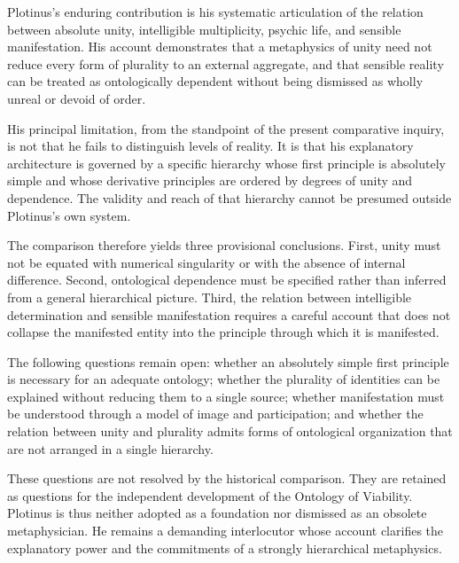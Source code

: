 \label{para:VS.B01.P01.C08.S06.SS10.P001}
Plotinus's enduring contribution is his systematic articulation
of the relation between absolute unity, intelligible multiplicity,
psychic life, and sensible manifestation. His account demonstrates
that a metaphysics of unity need not reduce every form of plurality
to an external aggregate, and that sensible reality can be treated
as ontologically dependent without being dismissed as wholly
unreal or devoid of order.

\label{para:VS.B01.P01.C08.S06.SS10.P002}
His principal limitation, from the standpoint of the present
comparative inquiry, is not that he fails to distinguish levels
of reality. It is that his explanatory architecture is governed
by a specific hierarchy whose first principle is absolutely
simple and whose derivative principles are ordered by degrees
of unity and dependence. The validity and reach of that hierarchy
cannot be presumed outside Plotinus's own system.

\label{para:VS.B01.P01.C08.S06.SS10.P003}
The comparison therefore yields three provisional conclusions.
First, unity must not be equated with numerical singularity or
with the absence of internal difference. Second, ontological
dependence must be specified rather than inferred from a general
hierarchical picture. Third, the relation between intelligible
determination and sensible manifestation requires a careful
account that does not collapse the manifested entity into the
principle through which it is manifested.

\label{para:VS.B01.P01.C08.S06.SS10.P004}
The following questions remain open: whether an absolutely simple
first principle is necessary for an adequate ontology; whether
the plurality of identities can be explained without reducing
them to a single source; whether manifestation must be understood
through a model of image and participation; and whether the
relation between unity and plurality admits forms of ontological
organization that are not arranged in a single hierarchy.

\label{para:VS.B01.P01.C08.S06.SS10.P005}
These questions are not resolved by the historical comparison.
They are retained as questions for the independent development
of the Ontology of Viability. Plotinus is thus neither adopted
as a foundation nor dismissed as an obsolete metaphysician.
He remains a demanding interlocutor whose account clarifies
the explanatory power and the commitments of a strongly
hierarchical metaphysics.

